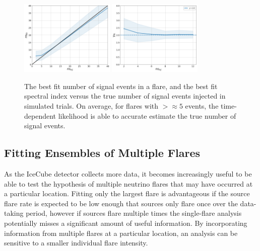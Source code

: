 \begin{figure}[h]
\centering
\includegraphics[width=0.4\textwidth]{figs/nsfit.png}
\includegraphics[width=0.4\textwidth]{figs/gamfit_2.0.png}
\caption{The best fit number of signal events in a flare, and the best fit spectral index versus the true number of signal events injected in simulated trials. On average, for flares with $> \approx 5$ events, the time-dependent likelihood is able to accurate estimate the true number of signal events.}
\label{fig:perflare_nsfit}
\end{figure}


\subsection{Fitting Ensembles of Multiple Flares}
As the IceCube detector collects more data, it becomes increasingly useful to be able to test the hypothesis of multiple neutrino flares that may have occurred at a particular location. Fitting only the largest flare is advantageous if the source flare rate is expected to be low enough that sources only flare once over the data-taking period, however if sources flare multiple times the single-flare analysis potentially misses a significant amount of useful information. By incorporating information from multiple flares at a particular location, an analysis can be sensitive to a smaller individual flare intensity. 

